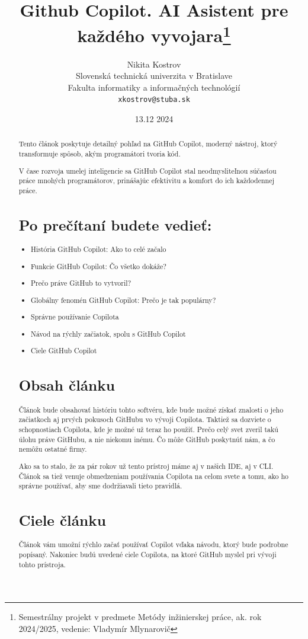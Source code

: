 \documentclass[10pt,oneside,slovak,a4paper, onecolumn]{article}
\title{Github Copilot. AI Asistent pre každého vyvojara\thanks{Semestrálny projekt v predmete Metódy inžinierskej práce, ak. rok 2024/2025, vedenie: Vladymír Mlynarovič}} %
\author{Nikita Kostrov\\[2pt]
	{\small Slovenská technická univerzita v Bratislave}\\
	{\small Fakulta informatiky a informačných technológií}\\
	{\small \texttt{xkostrov@stuba.sk}}
	}
\date{\small 13.12 2024} %
\begin{document}
\maketitle

\begin{abstract}

    Tento článok poskytuje detailný pohľad na GitHub Copilot, moderný nástroj, ktorý transformuje spôsob, akým programátori tvoria kód.

    V čase rozvoja umelej inteligencie sa GitHub Copilot stal neodmysliteľnou súčasťou práce mnohých programátorov, prinášajúc efektivitu a komfort do ich každodennej práce.

\section*{Po prečítaní budete vedieť:}

\begin{itemize}[itemsep=5pt]
    \item História GitHub Copilot: Ako to celé začalo
    \item Funkcie GitHub Copilot: Čo všetko dokáže?
    \item Prečo práve GitHub to vytvoril?
    \item Globálny fenomén GitHub Copilot: Prečo je tak populárny?
    \item Správne používanie Copilota
    \item Návod na rýchly začiatok, spolu s GitHub Copilot
    \item Ciele GitHub Copilot
\end{itemize}

\section*{Obsah článku}
Článok bude obsahovať históriu tohto softvéru, kde bude možné získať znalosti o jeho začiatkoch aj prvých pokusoch GitHubu vo vývoji Copilota. Taktiež sa dozviete o schopnostiach Copilota, kde je možné už teraz ho použiť. Prečo celý svet zveril takú úlohu práve GitHubu, a nie niekomu inému. Čo môže GitHub poskytnúť nám, a čo nemôžu ostatné firmy.

Ako sa to stalo, že za pár rokov už tento prístroj máme aj v našich IDE, aj v CLI. Článok sa tiež venuje obmedzeniam používania Copilota na celom svete a tomu, ako ho správne používať, aby sme dodržiavali tieto pravidlá.

\section*{Ciele článku}
Článok vám umožní rýchlo začať používať Copilot vďaka návodu, ktorý bude podrobne popísaný. Nakoniec budú uvedené ciele Copilota, na ktoré GitHub myslel pri vývoji tohto prístroja.
\end{abstract}
\end{document}
